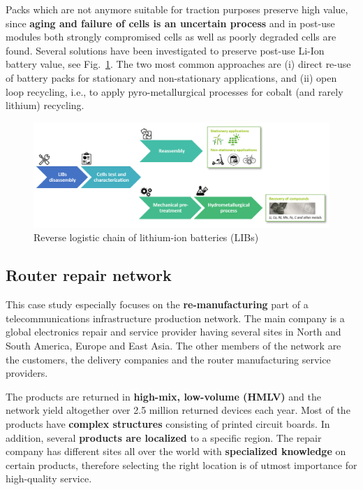 \documentclass{article}
\begin{document}
Packs which are not anymore suitable for traction purposes preserve high value, since \textbf{aging and failure of cells is an uncertain process} and in post-use modules both strongly compromised cells as well as poorly degraded cells are found. Several solutions have been investigated to preserve post-use Li-Ion battery value, see Fig.~\ref{fig:digiprime}. The two most common approaches are (i) direct re-use of battery packs for stationary and non-stationary applications, and (ii) open loop recycling, i.e., to apply pyro-metallurgical processes for cobalt (and rarely lithium) recycling.


\begin{figure}[ht!]
	\center
	\includegraphics[width=\textwidth]{digiprime.png} 
	\caption{Reverse logistic chain of lithium-ion batteries (LIBs)}\label{fig:digiprime}
\end{figure}


\subsection{Router repair network}

This case study especially focuses on the \textbf{re-manufacturing} part of a telecommunications infrastructure production network. The main company is a global electronics repair and service provider having several sites in North and South America, Europe and East Asia. The other members of the network are the customers, the delivery companies and the router manufacturing service providers.

The products are returned in \textbf{high-mix, low-volume (HMLV)} and the network yield altogether over 2.5 million returned devices each year. Most of the products have \textbf{complex structures} consisting of printed circuit boards. In addition, several \textbf{products are localized} to a specific region. The repair company has different sites all over the world with \textbf{specialized knowledge} on certain products, therefore selecting the right location is of utmost importance for high-quality service.
\end{document}

